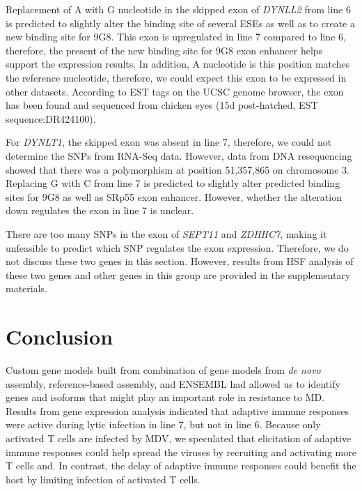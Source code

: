 \documentclass[10pt]{article}
\begin{document}
Replacement of A with G nucleotide in the skipped exon of {\em DYNLL2} from line
6 is predicted to slightly alter the binding site of several ESEs as well as to
create a new binding site for 9G8.  This exon is upregulated in line 7 compared
to line 6, therefore, the present of the new binding site for 9G8 exon enhancer
helps support the expression results.  In addition, A nucleotide is this
position matches the reference nucleotide, therefore, we could expect this exon
to be expressed in other datasets.  According to EST tags on the UCSC genome
browser, the exon has been found and sequenced from chicken eyes (15d
post-hatched, EST sequence:DR424100).

For {\em DYNLT1}, the skipped exon was absent in line 7, therefore, we could not
determine the SNPs from RNA-Seq data.  However, data from DNA resequencing
showed that there was a polymorphism at position 51,357,865 on chromosome 3.
Replacing G with C from line 7 is predicted to slightly alter predicted binding
sites for 9G8 as well as SRp55 exon enhancer.  However, whether the alteration
down regulates the exon in line 7 is unclear.

There are too many SNPs in the exon of {\em SEPT11} and {\em ZDHHC7}, making it
unfeasible to predict which SNP regulates the exon expression.  Therefore, we do
not discuss these two genes in this section.  However, results from HSF analysis
of these two genes and other genes in this group are provided in the
supplementary materials.

\section*{Conclusion}

Custom gene models built from combination of gene models from {\em de novo}
assembly, reference-based assembly, and ENSEMBL had allowed us to identify genes
and isoforms that might play an important role in resistance to MD.  Results
from gene expression analysis indicated that adaptive immune responses were
active during lytic infection in line 7, but not in line 6.  Because only
activated T cells are infected by MDV, we speculated that elicitation of
adaptive immune responses could help spread the viruses by recruiting and
activating more T cells and.  In contrast, the delay of adaptive immune
responses could benefit the host by limiting infection of activated T cells.
\end{document}
